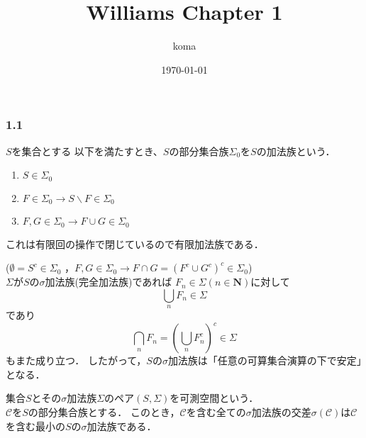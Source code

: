 \documentclass{jsarticle}
\title{Williams Chapter 1}
\author{koma}
\date{\today}
\begin{document}
\maketitle

\subsubsection*{1.1}

$S$を集合とする
以下を満たすとき、$S$の部分集合族$\Sigma_0$を$S$の加法族という．
\begin{enumerate}
    \item $S\in\Sigma_0$
    \item $F\in\Sigma_0 \rightarrow S\backslash F\in\Sigma_0$
    \item $F,G\in\Sigma_0 \rightarrow F\cup G\in\Sigma_0$
\end{enumerate}

これは有限回の操作で閉じているので有限加法族である．

($\emptyset=S^c\in\Sigma_0$
，$F,G\in\Sigma_0 \rightarrow F\cap G=(F^c\cup G^c)^c\in\Sigma_0$)
\\

$\Sigma$が$S$の$\sigma$加法族(完全加法族)であれば
$F_n\in\Sigma(n\in\mathbf{N})$に対して
\begin{equation}
    \bigcup_{n} F_n\in\Sigma \nonumber
\end{equation}
であり
\begin{equation}
    \bigcap_{n} F_n = \left(\bigcup_{n} F_n^c\right)^c \in\Sigma  \nonumber
\end{equation}
もまた成り立つ．
したがって，$S$の$\sigma$加法族は「任意の可算集合演算の下で安定」となる．

集合$S$とその$\sigma$加法族$\Sigma$のペア$(S,\Sigma)$を可測空間という．
\\

$\mathcal{C}$を$S$の部分集合族とする．
このとき，$\mathcal{C}$を含む全ての$\sigma$加法族の交差$\sigma(\mathcal{C})$は$\mathcal{C}$を含む最小の$S$の$\sigma$加法族である．
\end{document}
